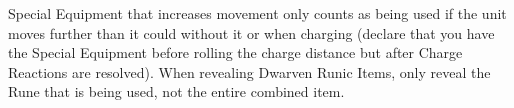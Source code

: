 \begin{optionalrules}
Special Equipment that increases movement only counts as being used if the unit moves further than it could without it or when charging (declare that you have the Special Equipment before rolling the charge distance but after Charge Reactions are resolved). When revealing Dwarven Runic Items, only reveal the Rune that is being used, not the entire combined item.
\end{optionalrules}

\debugfooter %

